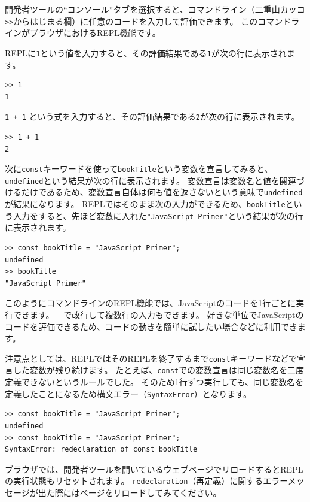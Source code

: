 開発者ツールの``コンソール''タブを選択すると、コマンドライン（二重山カッコ\texttt{>>}からはじまる欄）に任意のコードを入力して評価できます。
このコマンドラインがブラウザにおけるREPL機能です。

REPLに\texttt{1}という値を入力すると、その評価結果である\texttt{1}が次の行に表示されます。

\begin{lstlisting}
>> 1
1
\end{lstlisting}

\texttt{1 + 1}
という式を入力すると、その評価結果である\texttt{2}が次の行に表示されます。

\begin{lstlisting}
>> 1 + 1
2
\end{lstlisting}

次に\texttt{const}キーワードを使って\texttt{bookTitle}という変数を宣言してみると、\texttt{undefined}という結果が次の行に表示されます。
変数宣言は変数名と値を関連づけるだけであるため、変数宣言自体は何も値を返さないという意味で\texttt{undefined}が結果になります。
REPLではそのまま次の入力ができるため、\texttt{bookTitle}という入力をすると、先ほど変数に入れた\texttt{"JavaScript Primer"}という結果が次の行に表示されます。

\begin{lstlisting}
>> const bookTitle = "JavaScript Primer";
undefined
>> bookTitle
"JavaScript Primer"
\end{lstlisting}

このようにコマンドラインのREPL機能では、JavaScriptのコードを1行ごとに実行できます。
+で改行して複数行の入力もできます。
好きな単位でJavaScriptのコードを評価できるため、コードの動きを簡単に試したい場合などに利用できます。

注意点としては、REPLではそのREPLを終了するまで\texttt{const}キーワードなどで宣言した変数が残り続けます。
たとえば、\texttt{const}での変数宣言は同じ変数名を二度定義できないというルールでした。
そのため1行ずつ実行しても、同じ変数名を定義したことになるため構文エラー（\texttt{SyntaxError}）となります。

\begin{lstlisting}
>> const bookTitle = "JavaScript Primer";
undefined
>> const bookTitle = "JavaScript Primer";
SyntaxError: redeclaration of const bookTitle
\end{lstlisting}

ブラウザでは、開発者ツールを開いているウェブページでリロードするとREPLの実行状態もリセットされます。
\texttt{redeclaration}（再定義）に関するエラーメッセージが出た際にはページをリロードしてみてください。

